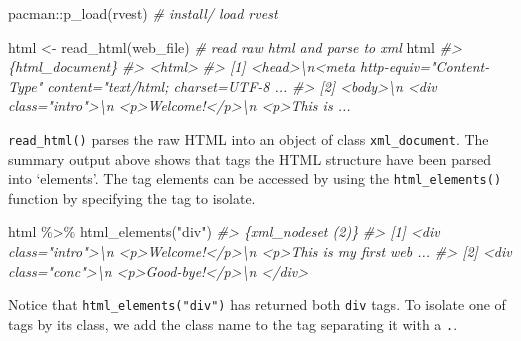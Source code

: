 \documentclass[
]{article}
\newenvironment{Shaded}{\begin{snugshade}}{\end{snugshade}}
\newcommand{\CommentTok}[1]{\textcolor[rgb]{0.56,0.35,0.01}{\textit{#1}}}
\newcommand{\FunctionTok}[1]{\textcolor[rgb]{0.00,0.00,0.00}{#1}}
\newcommand{\NormalTok}[1]{#1}
\newcommand{\OtherTok}[1]{\textcolor[rgb]{0.56,0.35,0.01}{#1}}
\newcommand{\SpecialCharTok}[1]{\textcolor[rgb]{0.00,0.00,0.00}{#1}}
\newcommand{\StringTok}[1]{\textcolor[rgb]{0.31,0.60,0.02}{#1}}
\begin{document}
\begin{Shaded}
\begin{Highlighting}[]
\NormalTok{pacman}\SpecialCharTok{::}\FunctionTok{p\_load}\NormalTok{(rvest)  }\CommentTok{\# install/ load \textasciigrave{}rvest\textasciigrave{}}

\NormalTok{html }\OtherTok{\textless{}{-}} \FunctionTok{read\_html}\NormalTok{(web\_file)  }\CommentTok{\# read raw html and parse to xml}
\NormalTok{html}
\CommentTok{\#\textgreater{} \{html\_document\}}
\CommentTok{\#\textgreater{} \textless{}html\textgreater{}}
\CommentTok{\#\textgreater{} [1] \textless{}head\textgreater{}\textbackslash{}n\textless{}meta http{-}equiv="Content{-}Type" content="text/html; charset=UTF{-}8 ...}
\CommentTok{\#\textgreater{} [2] \textless{}body\textgreater{}\textbackslash{}n    \textless{}div class="intro"\textgreater{}\textbackslash{}n      \textless{}p\textgreater{}Welcome!\textless{}/p\textgreater{}\textbackslash{}n      \textless{}p\textgreater{}This is  ...}
\end{Highlighting}
\end{Shaded}

\texttt{read\_html()} parses the raw HTML into an object of class \texttt{xml\_document}. The summary output above shows that tags the HTML structure have been parsed into `elements'. The tag elements can be accessed by using the \texttt{html\_elements()} function by specifying the tag to isolate.

\begin{Shaded}
\begin{Highlighting}[]
\NormalTok{html }\SpecialCharTok{\%\textgreater{}\%}
    \FunctionTok{html\_elements}\NormalTok{(}\StringTok{"div"}\NormalTok{)}
\CommentTok{\#\textgreater{} \{xml\_nodeset (2)\}}
\CommentTok{\#\textgreater{} [1] \textless{}div class="intro"\textgreater{}\textbackslash{}n      \textless{}p\textgreater{}Welcome!\textless{}/p\textgreater{}\textbackslash{}n      \textless{}p\textgreater{}This is my first web ...}
\CommentTok{\#\textgreater{} [2] \textless{}div class="conc"\textgreater{}\textbackslash{}n      \textless{}p\textgreater{}Good{-}bye!\textless{}/p\textgreater{}\textbackslash{}n    \textless{}/div\textgreater{}}
\end{Highlighting}
\end{Shaded}

Notice that \texttt{html\_elements("div")} has returned both \texttt{div} tags. To isolate one of tags by its class, we add the class name to the tag separating it with a \texttt{.}.
\end{document}
